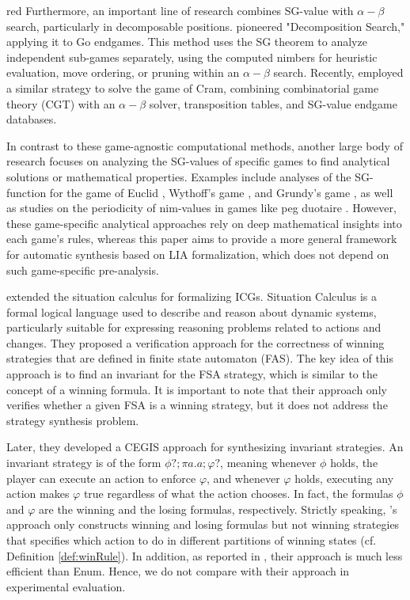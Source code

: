 \documentclass[review]{elsarticle}
\begin{document}
\begin{color}{red}
Furthermore, an important line of research combines SG-value with $\alpha-\beta$ search, particularly in decomposable positions. 
\cite{muller1999} pioneered "Decomposition Search," applying it to Go endgames. 
This method uses the SG theorem to analyze independent sub-games separately, using the computed nimbers for heuristic evaluation, move ordering, or pruning within an $\alpha-\beta$ search. 
Recently, \cite{uiterwijk2019} employed a similar strategy to solve the game of Cram, combining combinatorial game theory (CGT) with an $\alpha-\beta$ solver, transposition tables, and SG-value endgame databases.

In contrast to these game-agnostic computational methods, another large body of research focuses on analyzing the SG-values of specific games to find analytical solutions or mathematical properties. Examples include analyses of the SG-function for the game of Euclid \cite{cairns2011, nivasch2006}, Wythoff's game \cite{blass1990}, and Grundy's game \cite{guy1956g}, as well as studies on the periodicity of nim-values in games like peg duotaire \cite{grossman2004}. 
However, these game-specific analytical approaches rely on deep mathematical insights into each game's rules, whereas this paper aims to provide a more general framework for automatic synthesis based on LIA formalization, which does not depend on such game-specific pre-analysis.
\end{color}


\citet{LuoL2019} extended the situation calculus for formalizing ICGs.
Situation Calculus is a formal logical language used to describe and reason about dynamic systems, particularly suitable for expressing reasoning problems related to actions and changes.
They proposed a verification approach for the correctness of winning strategies that are defined in finite state automaton (FAS).
The key idea of this approach is to find an invariant for the FSA strategy, which is similar to the concept of a winning formula. It is important to note that their approach only verifies whether a given FSA is a winning strategy, but it does not address the strategy synthesis problem.
 
Later, they \cite{LuoL2022} developed a CEGIS approach for synthesizing invariant strategies.
An invariant strategy is of the form $\phi?; \pi a. a; \varphi?$, meaning whenever $\phi$ holds, the player can execute an action to enforce $\varphi$, and whenever $\varphi$ holds, executing any action makes $\varphi$ true regardless of what the action chooses.
In fact, the formulas $\phi$ and $\varphi$ are the winning and the losing formulas, respectively.
Strictly speaking, \citet{LuoL2022}'s approach only constructs winning and losing formulas but not winning strategies that specifies which action to do in different partitions of winning states (cf. Definition \ref{def:winRule}).
In addition, as reported in \cite{LuoL2022}, their approach is much less efficient than Enum.
Hence, we do not compare with their approach in experimental evaluation.
\end{document}

